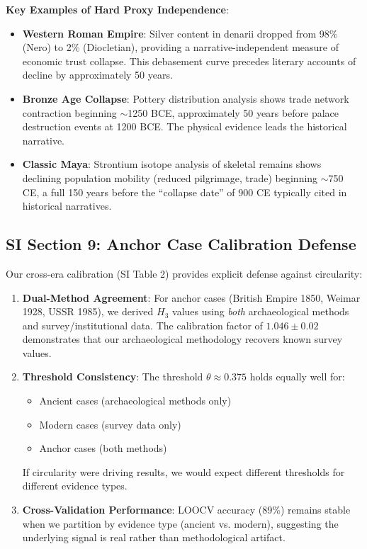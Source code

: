 \documentclass[11pt,a4paper]{article}
\newcommand{\Hthree}{H_3}
\begin{document}
\textbf{Key Examples of Hard Proxy Independence}:

\begin{itemize}
\item \textbf{Western Roman Empire}: Silver content in denarii dropped from 98\% (Nero) to 2\% (Diocletian), providing a narrative-independent measure of economic trust collapse. This debasement curve precedes literary accounts of decline by approximately 50 years.

\item \textbf{Bronze Age Collapse}: Pottery distribution analysis shows trade network contraction beginning $\sim$1250 BCE, approximately 50 years before palace destruction events at 1200 BCE. The physical evidence leads the historical narrative.

\item \textbf{Classic Maya}: Strontium isotope analysis of skeletal remains shows declining population mobility (reduced pilgrimage, trade) beginning $\sim$750 CE, a full 150 years before the ``collapse date'' of 900 CE typically cited in historical narratives.
\end{itemize}

\subsection{SI Section 9: Anchor Case Calibration Defense}

Our cross-era calibration (SI Table 2) provides explicit defense against circularity:

\begin{enumerate}
\item \textbf{Dual-Method Agreement}: For anchor cases (British Empire 1850, Weimar 1928, USSR 1985), we derived $\Hthree$ values using \textit{both} archaeological methods and survey/institutional data. The calibration factor of $1.046 \pm 0.02$ demonstrates that our archaeological methodology recovers known survey values.

\item \textbf{Threshold Consistency}: The threshold $\theta \approx 0.375$ holds equally well for:
\begin{itemize}
\item Ancient cases (archaeological methods only)
\item Modern cases (survey data only)
\item Anchor cases (both methods)
\end{itemize}

If circularity were driving results, we would expect different thresholds for different evidence types.

\item \textbf{Cross-Validation Performance}: LOOCV accuracy (89\%) remains stable when we partition by evidence type (ancient vs. modern), suggesting the underlying signal is real rather than methodological artifact.
\end{enumerate}
\end{document}
